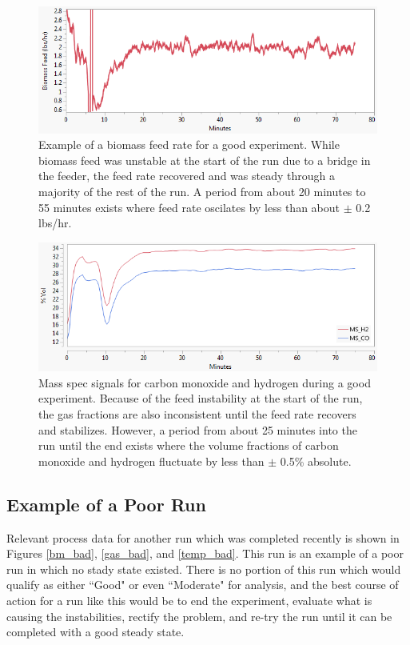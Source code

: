 \documentclass[11pt]{article}
\begin{document}
\begin{figure}[H]
    \centering
    \includegraphics[width = \textwidth]{bm_good.png}
    \caption{Example of a biomass feed rate for a good experiment.  While biomass feed was unstable at the start of the run due to a bridge in the feeder, the feed rate recovered and was steady through a majority of the rest of the run.  A period from about 20 minutes to 55 minutes exists where feed rate oscilates by less than about $\pm$ 0.2 lbs/hr. }
    \label{bm_good}
\end{figure}

\begin{figure}[H]
    \centering
    \includegraphics[width = \textwidth]{gas_good.png}
    \caption{Mass spec signals for carbon monoxide and hydrogen during a good experiment.  Because of the feed instability at the start of the run, the gas fractions are also inconsistent until the feed rate recovers and stabilizes.  However, a period from about 25 minutes into the run until the end exists where the volume fractions of carbon monoxide and hydrogen fluctuate by less than $\pm$ 0.5\% absolute.}
    \label{gas_good}
\end{figure}

\subsection*{Example of a Poor Run}

Relevant process data for another run which was completed recently is shown in Figures \ref{bm_bad}, \ref{gas_bad}, and \ref{temp_bad}.  This run is an example of a poor run in which no stady state existed.  There is no portion of this run which would qualify as either ``Good" or even ``Moderate" for analysis, and the best course of action for a run like this would be to end the experiment, evaluate what is causing the instabilities, rectify the problem, and re-try the run until it can be completed with a good steady state.
\end{document}
